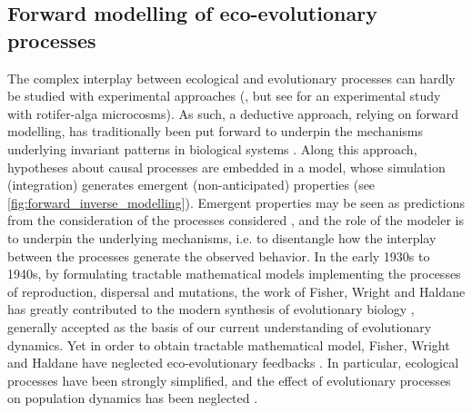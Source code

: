 \subsection{Forward modelling of eco-evolutionary processes}
The complex interplay between ecological and evolutionary processes can hardly be studied with experimental approaches (\cite{Pontarp2019,Hagen2022}, but see \cite{Becks2012} for an experimental study with rotifer-alga microcosms). 
As such, a deductive approach, relying on forward modelling, has traditionally been put forward to underpin the mechanisms underlying invariant patterns in biological systems \citep{Brummitt2020}. Along this approach, hypotheses about causal processes are embedded in a model, whose simulation (integration) generates emergent (non-anticipated) properties (see \cref{fig:forward_inverse_modelling}). Emergent properties may be seen as predictions from the consideration of the processes considered \citep{May2004}, and the role of the modeler is to underpin the underlying mechanisms, i.e. to disentangle how the interplay between the processes generate the observed behavior. 
% 
% 
In the early 1930s to 1940s, by formulating tractable mathematical models implementing the processes of reproduction, dispersal and mutations, the work of Fisher, Wright and Haldane has greatly contributed to the modern synthesis of evolutionary biology \citep{huxley1942evolution}, generally accepted as the basis of our current understanding of evolutionary dynamics. 
% 
% 
Yet in order to obtain tractable mathematical model, Fisher, Wright and Haldane have neglected eco-evolutionary feedbacks \citep{Govaert2019}. In particular, ecological processes have been strongly simplified, and the effect of evolutionary processes on population dynamics has been neglected \citep{Lion2022}.

